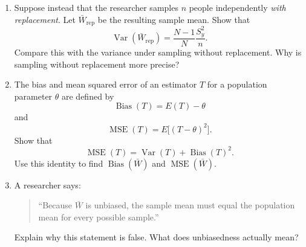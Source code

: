 \documentclass[11pt]{article}
\begin{document}
\begin{enumerate}[label=(\alph*), leftmargin=*]
\item Suppose instead that the researcher samples \(n\) people independently
\emph{with replacement}. Let \(\bar W_{\mathrm{rep}}\) be the resulting sample
mean. Show that
\[
\operatorname{Var}(\bar W_{\mathrm{rep}})
=
\frac{N-1}{N}\frac{S_y^2}{n}.
\]
Compare this with the variance under sampling without replacement. Why is
sampling without replacement more precise?

\item The bias and mean squared error of an estimator \(T\) for a population
parameter \(\theta\) are defined by
\[
\operatorname{Bias}(T)=E(T)-\theta
\]
and
\[
\operatorname{MSE}(T)=E\bigl[(T-\theta)^2\bigr].
\]
Show that
\[
\operatorname{MSE}(T)
=
\operatorname{Var}(T)+\operatorname{Bias}(T)^2.
\]
Use this identity to find \(\operatorname{Bias}(\bar W)\) and
\(\operatorname{MSE}(\bar W)\).

\item A researcher says:
\begin{quote}
``Because \(\bar W\) is unbiased, the sample mean must equal the population mean
for every possible sample.''
\end{quote}
Explain why this statement is false. What does unbiasedness actually mean?

\end{enumerate}
 
\end{document}
